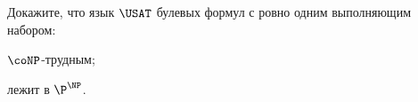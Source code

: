 Докажите, что язык $\USAT$ булевых формул с ровно одним выполняющим набором:
\begin{enumcyr}
    \item $\coNP$-трудным;
    \item лежит в $\P^{\NP}$.
\end{enumcyr}
